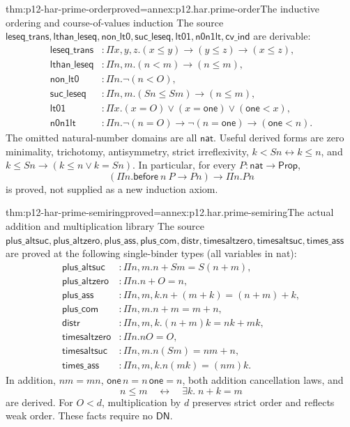 \begin{hblemma}{thm:p12-har-prime-order}{proved=annex:p12.har.prime-order}{The inductive ordering and course-of-values induction}
The source \(\mathsf{leseq\_trans},\mathsf{lthan\_leseq},
\mathsf{non\_lt0},\mathsf{suc\_leseq},\mathsf{lt01},
\mathsf{n0n1lt},\mathsf{cv\_ind}\) are derivable:
\[
\begin{aligned}
 \mathsf{leseq\_trans}&:\Pi x,y,z.(x\le y)\to(y\le z)\to(x\le z),\\
 \mathsf{lthan\_leseq}&:\Pi n,m.(n<m)\to(n\le m),\\
 \mathsf{non\_lt0}&:\Pi n.\neg(n<O),\\
 \mathsf{suc\_leseq}&:\Pi n,m.(S n\le S m)\to(n\le m),\\
 \mathsf{lt01}&:\Pi x.(x=O)\vee(x=\mathsf{one})\vee(\mathsf{one}<x),\\
 \mathsf{n0n1lt}&:\Pi n.\neg(n=O)\to\neg(n=\mathsf{one})\to(\mathsf{one}<n).
\end{aligned}
\]
The omitted natural-number domains are all \(\mathsf{nat}\). Useful derived
forms are zero minimality, trichotomy, antisymmetry, strict
irreflexivity, \(k<S n\leftrightarrow k\le n\), and
\(k\le S n\to(k\le n\vee k=S n)\). In particular, for every
\(P:\mathsf{nat}\to\mathsf{Prop}\),
\[
 (\Pi n.\mathsf{before}\ n\ P\to P n)\to\Pi n.P n
\]
is proved, not supplied as a new induction axiom.
\end{hblemma}

\begin{hblemma}{thm:p12-har-prime-semiring}{proved=annex:p12.har.prime-semiring}{The actual addition and multiplication library}
The source \(\mathsf{plus\_altsuc},\mathsf{plus\_altzero},
\mathsf{plus\_ass},\mathsf{plus\_com},\mathsf{distr},
\mathsf{timesaltzero},\mathsf{timesaltsuc},\mathsf{times\_ass}\)
are proved at the following single-binder types (all variables in nat):
\[
\begin{aligned}
 \mathsf{plus\_altsuc}&:\Pi n,m.n+S m=S(n+m),\\
 \mathsf{plus\_altzero}&:\Pi n.n+O=n,\\
 \mathsf{plus\_ass}&:\Pi n,m,k.n+(m+k)=(n+m)+k,\\
 \mathsf{plus\_com}&:\Pi n,m.n+m=m+n,\\
 \mathsf{distr}&:\Pi n,m,k.(n+m)k=nk+mk,\\
 \mathsf{timesaltzero}&:\Pi n.nO=O,\\
 \mathsf{timesaltsuc}&:\Pi n,m.n(S m)=nm+n,\\
 \mathsf{times\_ass}&:\Pi n,m,k.n(mk)=(nm)k.
\end{aligned}
\]
In addition,
\(nm=mn\), \(\mathsf{one}\,n=n\,\mathsf{one}=n\), both addition
cancellation laws, and
\[
 n\le m\quad\leftrightarrow\quad\exists k.\;n+k=m
\]
are derived. For \(O<d\), multiplication by \(d\) preserves strict
order and reflects weak order. These facts require no \(\mathsf{DN}\).
\end{hblemma}


